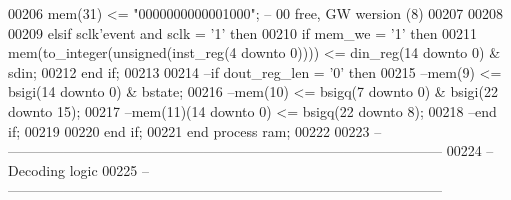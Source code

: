 \begin{DoxyCode}
00206             \textcolor{vhdlchar}{mem}\textcolor{vhdlchar}{(}\textcolor{vhdllogic}{}\textcolor{vhdllogic}{31}\textcolor{vhdlchar}{)}  \textcolor{vhdlchar}{<=} \textcolor{vhdllogic}{"0000000000001000"};\textcolor{keyword}{ -- 00 free, GW wersion (8)}
00207             
00208             
00209         \textcolor{keywordflow}{elsif} \textcolor{vhdlchar}{sclk}\textcolor{vhdlchar}{'}\textcolor{vhdlkeyword}{event} \textcolor{keywordflow}{and} \textcolor{vhdlchar}{sclk} \textcolor{vhdlchar}{=} \textcolor{vhdlchar}{'}\textcolor{vhdllogic}{}\textcolor{vhdllogic}{1}\textcolor{vhdlchar}{'} \textcolor{keywordflow}{then}
00210                 \textcolor{keywordflow}{if} \textcolor{vhdlchar}{mem_we} \textcolor{vhdlchar}{=} \textcolor{vhdlchar}{'}\textcolor{vhdllogic}{}\textcolor{vhdllogic}{1}\textcolor{vhdlchar}{'} \textcolor{keywordflow}{then}
00211                     \textcolor{vhdlchar}{mem}\textcolor{vhdlchar}{(}\textcolor{vhdlchar}{to\_integer}\textcolor{vhdlchar}{(}\textcolor{comment}{unsigned}\textcolor{vhdlchar}{(}\textcolor{vhdlchar}{inst_reg}\textcolor{vhdlchar}{(}\textcolor{vhdllogic}{}\textcolor{vhdllogic}{4} \textcolor{keywordflow}{downto} \textcolor{vhdllogic}{}\textcolor{vhdllogic}{0}\textcolor{vhdlchar}{)}\textcolor{vhdlchar}{)}\textcolor{vhdlchar}{)}\textcolor{vhdlchar}{)} \textcolor{vhdlchar}{<=} \textcolor{vhdlchar}{din_reg}\textcolor{vhdlchar}{(}\textcolor{vhdllogic}{}\textcolor{vhdllogic}{14} \textcolor{keywordflow}{downto} \textcolor{vhdllogic}{}\textcolor{vhdllogic}{0}\textcolor{vhdlchar}{)} \textcolor{vhdlchar}{&} \textcolor{vhdlchar}{
      sdin};
00212                 \textcolor{keywordflow}{end} \textcolor{keywordflow}{if};
00213                 
00214 \textcolor{keyword}{                --if dout\_reg\_len = '0' then}
00215 \textcolor{keyword}{                    --mem(9)  <= bsigi(14 downto 0) & bstate;}
00216 \textcolor{keyword}{                    --mem(10) <= bsigq(7 downto 0) & bsigi(22 downto 15);}
00217 \textcolor{keyword}{                    --mem(11)(14 downto 0) <= bsigq(22 downto 8);}
00218 \textcolor{keyword}{                --end if;}
00219                 
00220         \textcolor{keywordflow}{end} \textcolor{keywordflow}{if};
00221     \textcolor{keywordflow}{end} \textcolor{keywordflow}{process} \textcolor{vhdlchar}{ram};
00222     
00223 \textcolor{keyword}{    -- ---------------------------------------------------------------------------------------------}
00224 \textcolor{keyword}{    -- Decoding logic}
00225 \textcolor{keyword}{    -- ---------------------------------------------------------------------------------------------}

\end{DoxyCode}

